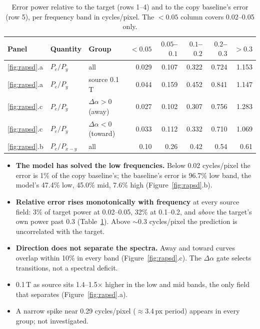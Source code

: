 \documentclass[10pt,a4paper]{article}
\newcommand{\da}{\Delta\alpha}
\begin{document}
\begin{table}[H]
\centering\small
\begin{tabular}{lllrrrrr}
\toprule
Panel & Quantity & Group & $<0.05$ & $0.05$--$0.1$ & $0.1$--$0.2$ & $0.2$--$0.3$ & $>0.3$ \\
\midrule
\ref{fig:rapsd}.a & $P_e / P_y$ & all            & 0.029 & 0.107 & 0.322 & 0.724 & 1.153 \\
\ref{fig:rapsd}.a & $P_e / P_y$ & source 0.1\,T  & 0.044 & 0.159 & 0.452 & 0.841 & 1.147 \\
\ref{fig:rapsd}.c & $P_e / P_y$ & $\da>0$ (away)   & 0.027 & 0.102 & 0.307 & 0.756 & 1.283 \\
\ref{fig:rapsd}.c & $P_e / P_y$ & $\da<0$ (toward) & 0.033 & 0.112 & 0.332 & 0.710 & 1.069 \\
\ref{fig:rapsd}.b & $P_e / P_{x-y}$ & all        & 0.10  & 0.26  & 0.42  & 0.54  & 0.61 \\
\bottomrule
\end{tabular}
\caption{Error power relative to the target (rows 1--4) and to the copy baseline's error
(row 5), per frequency band in cycles/pixel. The $<0.05$ column covers 0.02--0.05 only.}
\label{tab:bands}
\end{table}

\begin{itemize}
  \item \textbf{The model has solved the low frequencies.} Below 0.02 cycles/pixel the error is
        1\% of the copy baseline's; the baseline's error is 96.7\% low band, the model's 47.4\%
        low, 45.0\% mid, 7.6\% high (Figure~\ref{fig:rapsd}.b).
  \item \textbf{Relative error rises monotonically with frequency} at every source field:
        3\% of target power at 0.02--0.05, 32\% at 0.1--0.2, and \emph{above} the target's own
        power past 0.3 (Table~\ref{tab:bands}). Above $\sim$0.3 cycles/pixel the prediction is
        uncorrelated with the target.
  \item \textbf{Direction does not separate the spectra.} Away and toward curves overlap within
        10\% in every band (Figure~\ref{fig:rapsd}.c). The $\da$ gate selects transitions,
        not a spectral deficit.
  \item 0.1\,T as source sits 1.4--1.5$\times$ higher in the low and mid bands, the only field
        that separates (Figure~\ref{fig:rapsd}.a).
  \item A narrow spike near 0.29 cycles/pixel ($\approx$3.4\,px period) appears in every group;
        not investigated.
\end{itemize}
\end{document}
